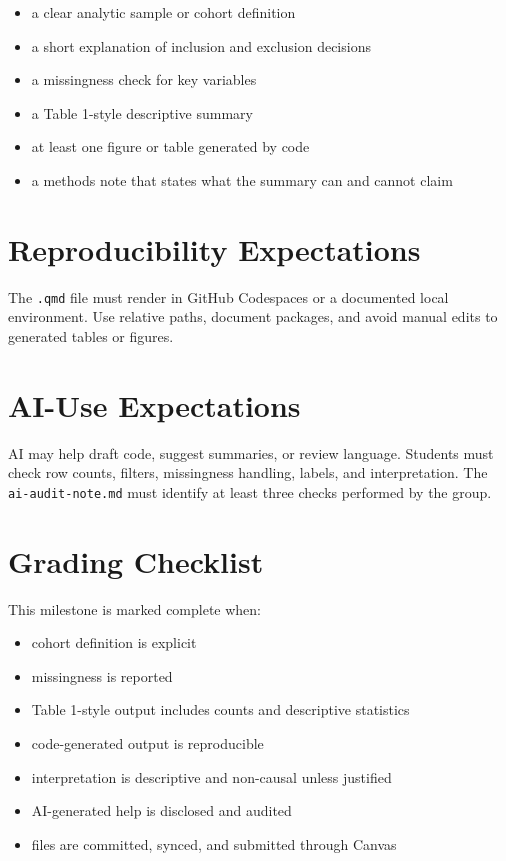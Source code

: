 \documentclass[
  letterpaper,
  DIV=11,
  numbers=noendperiod,
  oneside]{scrreprt}
\providecommand{\tightlist}{%
  \setlength{\itemsep}{0pt}\setlength{\parskip}{0pt}}
\begin{document}
\begin{itemize}
\tightlist
\item
  a clear analytic sample or cohort definition
\item
  a short explanation of inclusion and exclusion decisions
\item
  a missingness check for key variables
\item
  a Table 1-style descriptive summary
\item
  at least one figure or table generated by code
\item
  a methods note that states what the summary can and cannot claim
\end{itemize}

\section{Reproducibility
Expectations}\label{reproducibility-expectations-4}

The \texttt{.qmd} file must render in GitHub Codespaces or a documented
local environment. Use relative paths, document packages, and avoid
manual edits to generated tables or figures.

\section{AI-Use Expectations}\label{ai-use-expectations-3}

AI may help draft code, suggest summaries, or review language. Students
must check row counts, filters, missingness handling, labels, and
interpretation. The \texttt{ai-audit-note.md} must identify at least
three checks performed by the group.

\section{Grading Checklist}\label{grading-checklist-2}

This milestone is marked complete when:

\begin{itemize}
\tightlist
\item
  cohort definition is explicit
\item
  missingness is reported
\item
  Table 1-style output includes counts and descriptive statistics
\item
  code-generated output is reproducible
\item
  interpretation is descriptive and non-causal unless justified
\item
  AI-generated help is disclosed and audited
\item
  files are committed, synced, and submitted through Canvas
\end{itemize}
\end{document}
